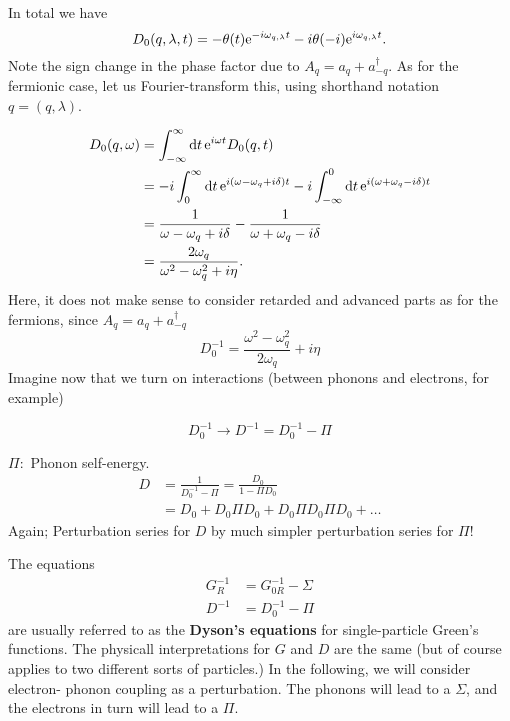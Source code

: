 In total we have
\begin{equation} 
D_0(q, \lambda, t) = -\theta(t)\mathrm{e}^{-i\omega_{q, \lambda}t} -i\theta(-i)\mathrm{e}^{i\omega_{q,\lambda}t}.
\end{equation}
Note the sign change in the phase factor due to $A_q = a_q+ a_{-q}^\dagger$.
As for the fermionic case, let us Fourier-transform this, using shorthand notation $q = (q, \lambda)$.

\begin{align} 
\begin{split} 
D_0(q, \omega) &= \int_{-\infty}^\infty\dd{t}\mathrm{e}^{i\omega t}D_0(q, t) \\
&= -i\int_{0}^{\infty}\dd{t}\mathrm{e}^{i(\omega-\omega_{q} + i\delta)t} -i \int_{-\infty}^{0}\dd{t}\mathrm{e}^{i(\omega + \omega_{q} -i\delta)t} \\
&= \frac{1}{\omega -\omega_q + i\delta} - \frac{1}{\omega + \omega_q -i\delta} \\
&= \frac{2\omega_q}{\omega^2-\omega_q^2 + i\eta}.
\end{split}
\end{align}
Here, it does not make sense to consider retarded and advanced parts as for the fermions, since $A_q = a_q + a_{-q}^\dagger$
\begin{equation} 
D_0^{-1} = \frac{\omega^2 - \omega_q^2}{2\omega_q} + i\eta
\end{equation}
Imagine now that we turn on interactions (between phonons and electrons, for example)

\begin{tcolorbox}
\begin{equation} 
D_0^{-1} \rightarrow D^{-1} = D_{0}^{-1} - \Pi
\end{equation}
\end{tcolorbox}
$\Pi:$ Phonon self-energy.
\begin{align*} 
D &= \frac{1}{D_0^{-1} - \Pi} = \frac{D_0}{1-\Pi D_0} \\
&= D_0  + D_0\Pi D_0 + D_0 \Pi D_0\Pi D_0 + \dots
\end{align*}
Again; Perturbation series for $D$ by much simpler perturbation series for $\Pi$!

The equations
\begin{align} 
G_R^{-1} &= G_{0R}^{-1} - \Sigma \\
D^{-1} &= D_{0}^{-1} - \Pi
\end{align}
are usually referred to as the \textbf{Dyson's equations} for single-particle Green's functions. The physicall interpretations for $G$ and $D$ are the same (but of course applies to two different sorts of particles.)
In the following, we will consider electron- phonon coupling as a perturbation. The phonons will lead to a $\Sigma$, and the electrons in turn will lead to a $\Pi$.


